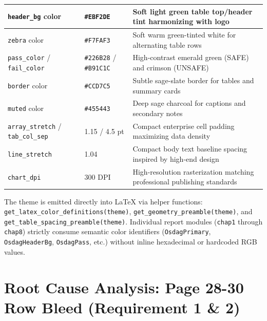 \documentclass[12pt,a4paper]{article}
\begin{document}
\begin{table}[htbp]
\begin{tabularx}{\textwidth}{|l|l|X|}
    \hline
    \rowcolor{OsdagZebra}
    \texttt{header\_bg} color & \texttt{\#EBF2DE} & Soft light green table top/header tint harmonizing with logo \\
    \hline
    \texttt{zebra} color & \texttt{\#F7FAF3} & Soft warm green-tinted white for alternating table rows \\
    \hline
    \rowcolor{OsdagZebra}
    \texttt{pass\_color} / \texttt{fail\_color} & \texttt{\#226B28} / \texttt{\#B91C1C} & High-contrast emerald green (SAFE) and crimson (UNSAFE) \\
    \hline
    \texttt{border} color & \texttt{\#CCD7C5} & Subtle sage-slate border for tables and summary cards \\
    \hline
    \rowcolor{OsdagZebra}
    \texttt{muted} color & \texttt{\#455443} & Deep sage charcoal for captions and secondary notes \\
    \hline
    \texttt{array\_stretch} / \texttt{tab\_col\_sep} & 1.15 / 4.5 pt & Compact enterprise cell padding maximizing data density \\
    \hline
    \rowcolor{OsdagZebra}
    \texttt{line\_stretch} & 1.04 & Compact body text baseline spacing inspired by high-end design \\
    \hline
    \texttt{chart\_dpi} & 300 DPI & High-resolution rasterization matching professional publishing standards \\
    \hline
  \end{tabularx}
\end{table}

The theme is emitted directly into LaTeX via helper functions: \texttt{get\_latex\_color\_definitions(theme)}, \texttt{get\_geometry\_preamble(theme)}, and \texttt{get\_table\_spacing\_preamble(theme)}. Individual report modules (\nolinkurl{chap1} through \nolinkurl{chap8}) strictly consume semantic color identifiers (\texttt{OsdagPrimary}, \texttt{OsdagHeaderBg}, \texttt{OsdagPass}, etc.) without inline hexadecimal or hardcoded RGB values.

\newpage

\section{Root Cause Analysis: Page 28-30 Row Bleed (Requirement 1 \& 2)}
\end{document}
